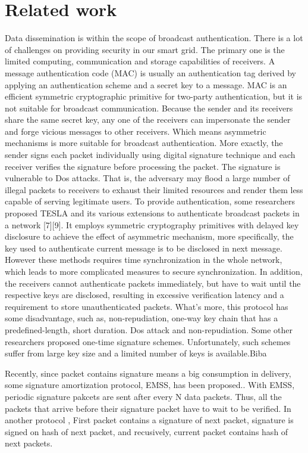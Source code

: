 \documentclass[10pt, conference, compsocconf]{IEEEtran}
\begin{document}
\section{Related work}
Data dissemination is within the scope of broadcast authentication.
There is a lot of challenges on providing security in our smart grid. The primary one is the limited computing, communication and storage capabilities of receivers. A message authentication code (MAC) is usually an authentication tag derived by applying an authentication scheme and a secret key to a  message.
MAC is an efficient symmetric cryptographic primitive for two-party authentication, but it is not suitable for broadcast communication. Because the sender and its receivers share the same secret key, any one of the receivers can impersonate the sender and forge vicious messages to other receivers. Which means asymmetric mechanisms is more suitable for broadcast authentication. More exactly, the sender signs each packet individually using digital signature technique and each receiver verifies the signature before processing the packet. The signature is vulnerable to Dos attacks. That is, the adversary may flood a large number of illegal packets to receivers to exhaust their limited resources and render them less capable of serving legitimate users. To provide authentication, some researchers proposed TESLA and its various extensions to authenticate broadcast packets in a network [7][9]. It employs symmetric cryptography primitives with delayed key disclosure to achieve the effect of asymmetric mechanism, more specifically, the key used to authenticate current message is to be disclosed in next  message. However these methods requires time synchronization in the whole network, which leads to more complicated measures to secure synchronization. In addition, the receivers cannot authenticate packets immediately, but have to wait until the respective keys are disclosed, resulting in excessive verification latency and a requirement to store unauthenticated packets. What's more, this protocol has some disadvantage, such as, non-repudiation, one-way key chain that has a predefined-length, short duration.   Dos attack
\cite{a} and non-repudiation. Some other researchers proposed one-time signature schemes. Unfortunately, such schemes suffer from large key size and a limited number of keys is available.{Biba}

Recently, since packet contains signature  means a big consumption in delivery, some signature amortization protocol, EMSS, has been proposed.. With EMSS\cite{efficient}, periodic signature pakcets are sent after every N data packets. Thus, all the packets that arrive before their signature packet have to wait to be verified.
In another protocol \cite{aspect} , First packet contains a signature of next packet, signature is signed on hash of next packet, and recusively, current packet contains hash of next packets. 
\end{document}

